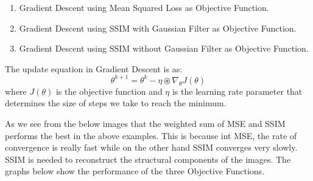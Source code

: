 \documentclass[a4paper, 15pt]{article}
\begin{document}
	\begin{enumerate}
		\item Gradient Descent using Mean Squared Loss as Objective Function.
		\item Gradient Descent using SSIM with Gaussian Filter as Objective Function.
		\item Gradient Descent using SSIM without Gaussian Filter as Objective Function.
	\end{enumerate}
	\par The update equation in Gradient Descent is as:
	\begin{equation}
	\theta^{k+1} = \theta^{k} - \eta \circledast \nabla_{\theta}J(\theta)
	\end{equation}
	where $J(\theta)$ is the objective function and $\eta$ is the learning rate parameter that determines the size of steps we take to reach the minimum. 
	\par
	\par
	As we see from the below images that the weighted sum of MSE and SSIM performs the best in the above examples. This is because int MSE, the rate of convergence is really fast while on the other hand SSIM converges very slowly. SSIM is needed to reconstruct the structural components of the images. The graphs below show the performance of the three Objective Functions. 
	\par
	\newpage
	\graphicspath{{results/}}
\end{document}
